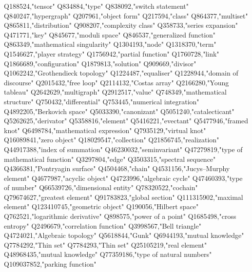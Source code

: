 Q188524,"tensor"
Q834884,"type"
Q838092,"switch statement"
Q840247,"hypergraph"
Q207961,"object form"
Q217594,"class"
Q864377,"multiset"
Q865811,"distribution"
Q908207,"complexity class"
Q358733,"series expansion"
Q471771,"key"
Q845677,"moduli space"
Q846537,"generalized function"
Q863349,"mathematical singularity"
Q1304193,"node"
Q1318370,"term"
Q1546627,"player strategy"
Q1756942,"partial function"
Q1760728,"link"
Q1866689,"configuration"
Q1879813,"solution"
Q909669,"divisor"
Q1062242,"Grothendieck topology"
Q1224487,"equaliser"
Q1228944,"domain of discourse"
Q2015432,"free loop"
Q2114132,"Costas array"
Q2166280,"Young tableau"
Q2642629,"multigraph"
Q2912517,"value"
Q748349,"mathematical structure"
Q750432,"differential"
Q753445,"numerical integration"
Q4892205,"Berkovich space"
Q5033390,"canonizant"
Q5051240,"catalecticant"
Q5262625,"derivator"
Q5358816,"element"
Q5416221,"evectant"
Q5477946,"framed knot"
Q6498784,"mathematical expression"
Q7935129,"virtual knot"
Q16089841,"zero object"
Q18029547,"collection"
Q21856745,"realization"
Q44917388,"index of summation"
Q46230032,"seminvariant"
Q47279819,"type of mathematical function"
Q3297804,"edge"
Q3503315,"spectral sequence"
Q4366381,"Pontryagin surface"
Q4504468,"chain"
Q4531156,"Jucys–Murphy element"
Q4677987,"acyclic object"
Q4723996,"algebraic cycle"
Q47460393,"type of number"
Q66539726,"dimensional entity"
Q78320522,"cochain"
Q79674627,"greatest element"
Q91783823,"global section"
Q111315902,"maximal element"
Q123410745,"geometric object"
Q190056,"Hilbert space"
Q762521,"logarithmic derivative"
Q898575,"power of a point"
Q1685498,"cross entropy"
Q2496679,"correlation function"
Q3998567,"Bell triangle"
Q4724021,"Algebraic topology"
Q5618844,"Gunk"
Q6944193,"mutual knowledge"
Q7784292,"Thin set"
Q7784293,"Thin set"
Q25105219,"real element"
Q48968435,"mutual knowledge"
Q77359186,"type of natural numbers"
Q109037852,"parking function"